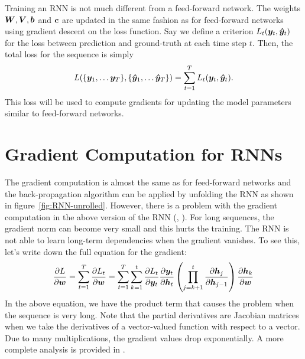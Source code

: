 		Training an RNN is not much different from a feed-forward network.
		The weights $\bm{W}, \bm{V}, \bm{b}$ and $\bm{c}$ are updated in the same fashion as for feed-forward networks using gradient descent on the loss function.
		Say we define a criterion $L_t(\bm{y}_t, \bm{\hat{y}}_t)$ for the loss between prediction and ground-truth at each time step $t$.
		Then, the total loss for the sequence is simply 
		\begin{equation}\label{eq:loss_for_rnn}
			L(\{\vectr{y}_1, \dots \vectr{y}_T\}, \{\vectr{\hat{y}}_1, \dots \vectr{\hat{y}}_T\}) = \sum_{t=1}^{T} L_t(\vectr{y}_t, \vectr{\hat{y}}_t).
		\end{equation}
		This loss will be used to compute gradients for updating the model parameters similar to feed-forward networks.
		
	\section{Gradient Computation for RNNs}\label{sec:gradient_computation_RNN}
		The gradient computation is almost the same as for feed-forward networks and the back-propagation algorithm can be applied by unfolding the RNN as shown in figure~\ref{fig:RNN-unrolled}.
		However, there is a problem with the gradient computation in the above version of the RNN (\cite{pascanu2013difficulty}, \cite{bengio1994learning}).
		For long sequences, the gradient norm can become very small and this hurts the training.
		The RNN is not able to learn long-term dependencies when the gradient vanishes.
		To see this, let's write down the full equation for the gradient:
		\begin{equation}\label{eq:gradient_computation_RNN}
			\frac{\partial L}{\partial \bm{w}}
			= \sum_{t=1}^{T} 
				\frac{\partial L_t}{\partial \bm{w}}
			= \sum_{t=1}^{T} 
				\sum_{k=1}^{t} 
					\frac{\partial L_t}{\partial \bm{y}_t}
					\frac{\partial \bm{y}_t}{\partial \bm{h}_t}
					\left(
						\prod_{j=k+1}^{t} \frac{\partial \bm{h}_j}{\partial \bm{h}_{j-1}}
					\right)
					\frac{\partial \bm{h}_{k}}{\partial \bm{w}}
		\end{equation}
		In the above equation, we have the product term that causes the problem when the sequence is very long.
		Note that the partial derivatives are Jacobian matrices when we take the derivatives of a vector-valued function with respect to a vector.
		Due to many multiplications, the gradient values drop exponentially.
		A more complete analysis is provided in \cite{pascanu2013difficulty}.
		
